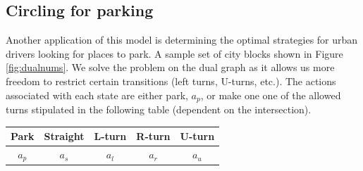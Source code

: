 


\subsection{Circling for parking}
\label{sec:circling}

Another application of this model is determining the optimal strategies for urban drivers looking for places to park.  A sample set of city blocks shown in Figure \ref{fig:dualnums}.  We solve the problem on the dual graph as it allows us more freedom to restrict certain transitions (left turns, U-turns, etc.).  The actions associated with each state are either park, $a_p$, or make one one of the allowed turns stipulated in the following table (dependent on the intersection).
\begin{center}
\begin{tabular}{|c|cccc|}
\hline
Park & Straight & L-turn & R-turn & U-turn \\
\hline
$a_p$ & $a_s$ & $a_l$ & $a_r$ & $a_u$ \\
\hline
\end{tabular}
\end{center}



